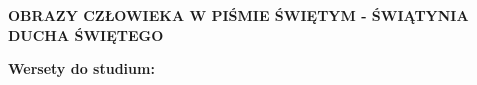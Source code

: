\documentclass[10pt,a4paper,oneside]{article}
\begin{document}
\centerline{\textbf{\MakeUppercase{Obrazy człowieka w Piśmie Świętym - Świątynia Ducha Świętego}}}
\begin{center}
\textbf{Wersety do studium:} 

\end{center}
\end{document}
